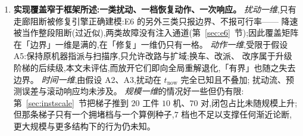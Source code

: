 \documentclass[manuscript,screen,review]{acmart}
\newcommand{\NPubNets}{2}
\newcommand{\PubCloSpread}{0.207}
\newcommand{\ScaleKs}{7}
\newcommand{\ScalePairs}{70}
\newcommand{\ScaleJobsHi}{20}
\newcommand{\ScaleMachHi}{10}
\begin{document}
\begin{enumerate}[leftmargin=1.6em,itemsep=0.35em]
\emph{(iv) 闭包规模的结构可预测性未能建立,且已知不由装卸点处的静态割给出}:
最小割与漏斗占比都没有做出可复现的区分;换用外部来源布局后这一点变得更确定——这两个指标
在整批外部算例上\emph{取值恒定}(两张路网都把装卸站放在网格角点,四邻接下角点恰有两条
出边),而闭包占比在\emph{同一张}路网上仅换机器落位就变动 \PubCloSpread(第~\ref{sec:e4}~节)。
须注意这条否证的适用范围:外部算例在路网几何这一维只有 \NPubNets\ 个独立样本,故本文
否证的是「静态割能解释闭包规模」,\emph{不是}「路网几何与闭包规模无关」——后者需要更多张
互不相同的公开路网才能检验,而可得的公开路网就这么多。下一个候选刻画应是
\(t_{\mathrm{now}}\) 邻域内走廊占用的时序密度,本文未做。

\item \textbf{实现覆盖窄于框架所述:一类扰动、一档恢复动作、一次响应。}
\emph{扰动一维},只有走廊阻断被修复引擎正确建模:E6 的另外三类只报边界、不报可行率——
降速被当作整段阻断(过近似),两类故障没有注入通道(第~\ref{sec:e6}~节);因此覆盖矩阵
在「边界」一维是满的,在「修复」一维仍只有一格。
\emph{动作一维},受限于假设 A5:保持原机器指派与扫描序,只允许改路与扩域;换车、改派、
改序属于升级阶梯的后续级,本文未评估,而放开它们即向全局重解退化,「有界」也随之失去边界。
\emph{时间一维},由假设 A2、A3,扰动在 \(t_{\mathrm{now}}\) 完全已知且不叠加;
扰动流、预测误差与滚动响应均未涉及。
\emph{规模一维}的情况好一些但仍有限:第~\ref{sec:instscale}~节把梯子推到
\(\ScaleJobsHi\) 工件 \(\ScaleMachHi\) 机、\(\ScalePairs\) 对,闭包占比未随规模上升;
但那条梯子只有一个拥堵档与一个算例种子,\(\ScaleKs\) 档也不足以支撑任何渐近论断,
更大规模与更多结构下的行为仍未知。


\end{enumerate}
\end{document}
